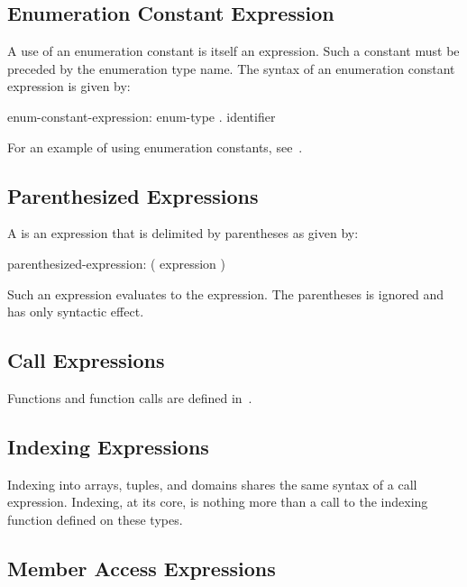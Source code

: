 \subsection{Enumeration Constant Expression}
\label{Enumeration_Constant_Expression}

A use of an enumeration constant is itself an expression.  Such a
constant must be preceded by the enumeration type name.  The syntax of
an enumeration constant expression is given by:
\begin{syntax}
enum-constant-expression:
  enum-type . identifier
\end{syntax}

\begin{example}
For an example of using enumeration constants,
see~.
\end{example}

\subsection{Parenthesized Expressions}
\label{Parenthesized_Expressions}

A  is an expression that is delimited
by parentheses as given by:
\begin{syntax}
parenthesized-expression:
  ( expression )
\end{syntax}
Such an expression evaluates to the expression.  The parentheses is
ignored and has only syntactic effect.

\subsection{Call Expressions}
\label{Call_Expressions}

Functions and function calls are defined in~.

\subsection{Indexing Expressions}
\label{Indexing_Expressions}

Indexing into arrays, tuples, and domains shares the same syntax of a
call expression.  Indexing, at its core, is nothing more than a call
to the indexing function defined on these types.

\subsection{Member Access Expressions}
\label{Member_Access_Expressions}

